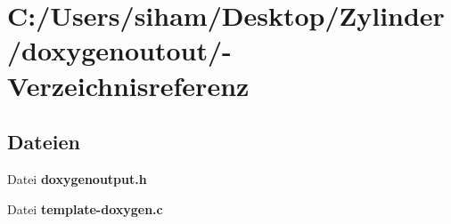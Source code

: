 \section{C:/Users/siham/Desktop/Zylinder/doxygenoutout/-Verzeichnisreferenz}
\label{dir_C_3A_2FUsers_2Fsiham_2FDesktop_2FZylinder_2Fdoxygenoutout_2F}


\subsection*{Dateien}
\begin{CompactItemize}
\item 
Datei {\bf doxygenoutput.h}
\item 
Datei {\bf template-doxygen.c}
\end{CompactItemize}
